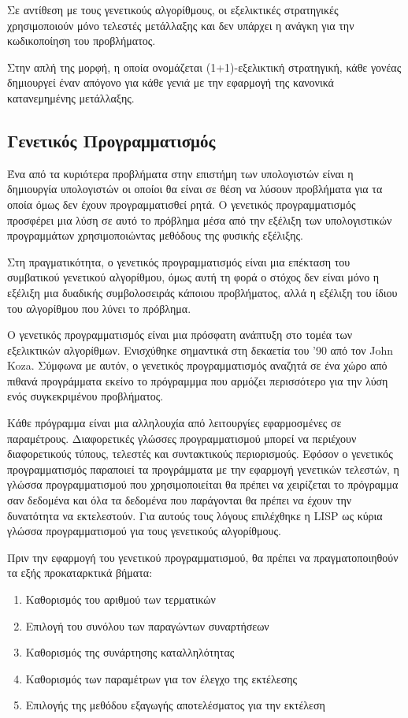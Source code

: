 Σε αντίθεση με τους γενετικούς αλγορίθμους, οι εξελικτικές στρατηγικές χρησιμοποιούν μόνο τελεστές μετάλλαξης και δεν υπάρχει η ανάγκη για την κωδικοποίηση του προβλήματος.

Στην απλή της μορφή, η οποία ονομάζεται (1+1)-εξελικτική στρατηγική, κάθε γονέας δημιουργεί έναν απόγονο για κάθε γενιά με την εφαρμογή της κανονικά κατανεμημένης μετάλλαξης.
\subsection{Γενετικός Προγραμματισμός}

Ένα από τα κυριότερα προβλήματα στην επιστήμη των υπολογιστών είναι η δημιουργία υπολογιστών οι οποίοι θα είναι σε θέση να λύσουν προβλήματα για τα οποία όμως δεν έχουν προγραμματισθεί ρητά. Ο γενετικός προγραμματισμός προσφέρει μια λύση σε αυτό το πρόβλημα μέσα από την εξέλιξη των υπολογιστικών προγραμμάτων χρησιμοποιώντας μεθόδους της φυσικής εξέλιξης.

Στη πραγματικότητα, ο γενετικός προγραμματισμός είναι μια επέκταση του συμβατικού γενετικού αλγορίθμου, όμως αυτή τη φορά ο στόχος δεν είναι μόνο η εξέλιξη μια δυαδικής συμβολοσειράς κάποιου προβλήματος, αλλά η εξέλιξη του ίδιου του αλγορίθμου που λύνει το πρόβλημα.

Ο γενετικός προγραμματισμός είναι μια πρόσφατη ανάπτυξη στο τομέα των εξελικτικών αλγορίθμων. Ενισχύθηκε σημαντικά στη δεκαετία του '90 από τον John Koza. 
Σύμφωνα με αυτόν, ο γενετικός προγραμματισμός αναζητά σε ένα χώρο από πιθανά προγράμματα εκείνο το πρόγραμμμα που αρμόζει περισσότερο για την λύση ενός συγκεκριμένου προβλήματος.

Κάθε πρόγραμμα είναι μια αλληλουχία από λειτουργίες εφαρμοσμένες σε παραμέτρους. Διαφορετικές γλώσσες προγραμματισμού μπορεί να περιέχουν διαφορετικούς τύπους, τελεστές και συντακτικούς περιορισμούς. Εφόσον ο γενετικός προγραμματισμός παραποιεί τα προγράμματα με την εφαρμογή γενετικών τελεστών, η γλώσσα προγραμματισμού που χρησιμοποιείται θα πρέπει να χειρίζεται το πρόγραμμα σαν δεδομένα και όλα τα δεδομένα που παράγονται θα πρέπει να έχουν την δυνατότητα να εκτελεστούν. Για αυτούς τους λόγους επιλέχθηκε η LISP ως κύρια γλώσσα προγραμματισμού για τους γενετικούς αλγορίθμους.

Πριν την εφαρμογή του γενετικού προγραμματισμού, θα πρέπει να πραγματοποιηθούν τα εξής προκαταρκτικά βήματα:

\begin{enumerate}
  \item Καθορισμός του αριθμού των τερματικών
  \item Επιλογή του συνόλου των παραγώντων συναρτήσεων
  \item Καθορισμός της συνάρτησης καταλληλότητας
  \item Καθορισμός των παραμέτρων για τον έλεγχο της εκτέλεσης
  \item Επιλογής της μεθόδου εξαγωγής αποτελέσματος για την εκτέλεση
\end{enumerate}

